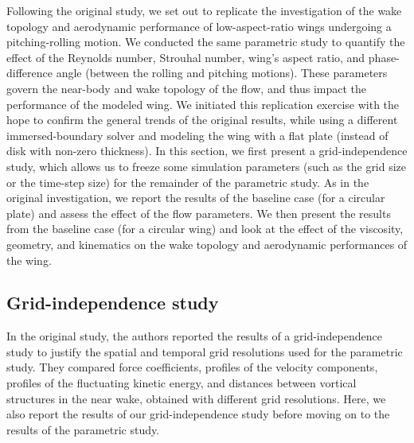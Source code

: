 Following the original study, we set out to replicate the investigation of the wake topology and aerodynamic performance of low-aspect-ratio wings undergoing a pitching-rolling motion.
We conducted the same parametric study to quantify the effect of the Reynolds number, Strouhal number, wing's aspect ratio, and phase-difference angle (between the rolling and pitching motions).
These parameters govern the near-body and wake topology of the flow, and thus impact the performance of the modeled wing.
We initiated this replication exercise with the hope to confirm the general trends of the original results, while using a different immersed-boundary solver and modeling the wing with a flat plate (instead of disk with non-zero thickness).
In this section, we first present a grid-independence study, which allows us to freeze some simulation parameters (such as the grid size or the time-step size) for the remainder of the parametric study.
As in the original investigation, we report the results of the baseline case (for a circular plate) and assess the effect of the flow parameters.
We then present the results from the baseline case (for a circular wing) and look at the effect of the viscosity, geometry, and kinematics on the wake topology and aerodynamic performances of the wing.

\subsection{Grid-independence study}

In the original study, the authors reported the results of a grid-independence study to justify the spatial and temporal grid resolutions used for the parametric study.
They compared force coefficients, profiles of the velocity components, profiles of the fluctuating kinetic energy, and distances between vortical structures in the near wake, obtained with different grid resolutions.
Here, we also report the results of our grid-independence study before moving on to the results of the parametric study.

